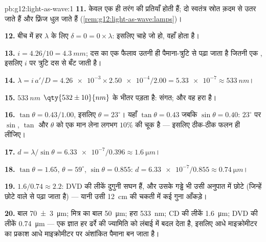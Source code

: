\begin{solution}{pb:g12:light-as-wave:1}
\textbf{11.} केवल एक ही तरंग की प्रतियाँ  होती हैं;
दो स्वतंत्र स्रोत क़दम से उतर जाते हैं और फ़्रिंज धुल जाते हैं (\cref{rem:g12:light-as-wave:lamps})।

\textbf{12.} बीच में हर $\lambda$ के लिए $\delta = 0 = 0 \times \lambda$: इसलिए 
चाहे जो हो, वहाँ  होता है।

\textbf{13.} $i = 4.26/10 = \qty{4.3}{mm}$; दस का एक फैलाव उतनी ही पैमाना-त्रुटि से पढ़ा जाता है
जितनी एक , इसलिए $i$ पर त्रुटि दस से बँट जाती है।

\textbf{14.} $\lambda = i\,a'/D = \num{4.26e-3} \times
\num{2.50e-4}/2.00 = \num{5.33e-7} \approx \qty{533}{nm}$।

\textbf{15.} $\qty{533}{nm}$ $\qty{532 \pm 10}{nm}$ के भीतर पड़ता है: संगत; और वह 
हरा है।

\textbf{16.} $\tan\theta = 0.43/1.00$, इसलिए $\theta = 23^\circ$। यहाँ $\tan\theta = 0.43$ जबकि $\sin\theta = 0.40$: $23^\circ$ पर
$\sin$, $\tan$ और $\theta$ को एक मान लेना लगभग $10\%$ की चूक है --- इसलिए
ठीक-ठीक फलन ही लीजिए।

\textbf{17.} $d = \lambda/\sin\theta = \num{6.33e-7}/0.396 \approx
\qty{1.6}{\micro m}$।

\textbf{18.} $\tan\theta = 1.65$, $\theta = 59^\circ$, $\sin\theta = 0.855$: $d = \num{6.33e-7}/0.855 \approx
\qty{0.74}{\micro m}$।

\textbf{19.} $1.6/0.74 \approx 2.2$: DVD की लीकें दुगुनी सघन हैं, और उसके गड्ढे भी उसी
अनुपात में छोटे (जिन्हें छोटे  वाले  से
पढ़ा जाता है) --- यानी उसी \qty{12}{cm} की चकती में कई गुना आँकड़े।

\textbf{20.} बाल \qty{70 \pm 3}{\micro m}; मित्र का बाल \qty{50}{\micro m}; हरा  \qty{533}{nm};
CD की लीकें \qty{1.6}{\micro m}; DVD की लीकें \qty{0.74}{\micro m} --- एक ज्ञात 
हर ढर्रे की ज्यामिति को लंबाई में बदल देता है, इसलिए आधे माइक्रोमीटर का
प्रकाश आधे माइक्रोमीटर पर अंशांकित पैमाना बन जाता है।
\end{solution}
